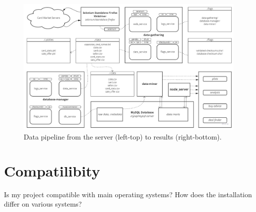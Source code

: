 \begin{figure}[h!]
\centering
\includegraphics[width=\textwidth]{figures/warehousing.jpg}
\caption{Data pipeline from the server (left-top) to results (right-bottom).}
\end{figure}


\section{Compatilibity}
Is my project compatible with main operating systems?
How does the installation differ on various systems?

